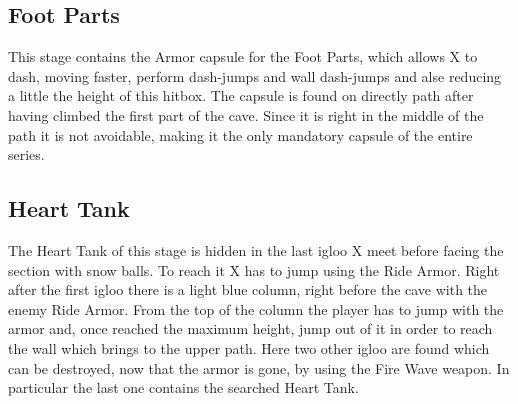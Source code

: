 \subsection{Foot Parts}
This stage contains the Armor capsule for the Foot Parts, which allows X to dash, moving faster, perform dash-jumps and wall dash-jumps and alse reducing a little the height of this hitbox. The capsule is found on directly path after having climbed the first part of the cave. Since it is right in the middle of the path it is not avoidable, making it the only mandatory capsule of the entire series.

\subsection{Heart Tank}\label{Penguin:heart_tank}
The Heart Tank of this stage is hidden in the last igloo X meet before facing the section with snow balls. To reach it X has to jump using the Ride Armor. Right after the first igloo there is a light blue column, right before the cave with the enemy Ride Armor. From the top of the column the player has to jump with the armor and, once reached the maximum height, jump out of it in order to reach the wall which brings to the upper path. Here two other igloo are found which can be destroyed, now that the armor is gone, by using the Fire Wave weapon. In particular the last one contains the searched Heart Tank.

